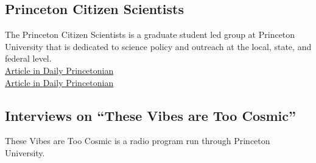 \documentclass{my_cv}
\begin{document}
\subsection{Princeton Citizen Scientists}
	The Princeton Citizen Scientists is a graduate student led group
at Princeton University that is dedicated to science policy and
outreach at the local, state, and federal level. 
\indentline
{}
\indentline
{}
   \\\indent
   \href{http://www.dailyprincetonian.com/article/2019/01/justin-ripley-q-and-a}{
      Article in Daily Princetonian
   }
\indentline
{}
   \\\indent
   \href{http://www.dailyprincetonian.com/article/2017/10/princeton-citizen-scientists-host-teach-in-at-princeton-public-library}{
      Article in Daily Princetonian
   }
\subsection{Interviews on ``These Vibes are Too Cosmic''}
	These Vibes are Too Cosmic is a radio program run through
	Princeton University.
\begin{itemize}
\end{itemize}
\end{document}
